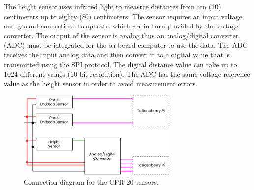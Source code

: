 \documentclass{article}
\begin{document}
The height sensor uses infrared light to measure distances from ten (10) centimeters up to eighty (80) centimeters. The sensor requires an input voltage and ground connections to operate, which are in turn provided by the voltage converter. The output of the sensor is analog thus an analog/digital converter (ADC) must be integrated for the on-board computer to use the data. The ADC receives the input analog data and then convert it to a digital value that is transmitted using the SPI protocol. The digital distance value can take up to 1024 different values (10-bit resolution). The ADC has the same voltage reference value as the height sensor in order to avoid measurement errors.

\begin{figure}[h]
    \centering
    \includegraphics[width=0.7\textwidth]{images/electronics/sensors/GPR20_sensors_conn.pdf}
    \caption{Connection diagram for the GPR-20 sensors.}
    \label{fig:sensors_conn}
\end{figure}
\end{document}
